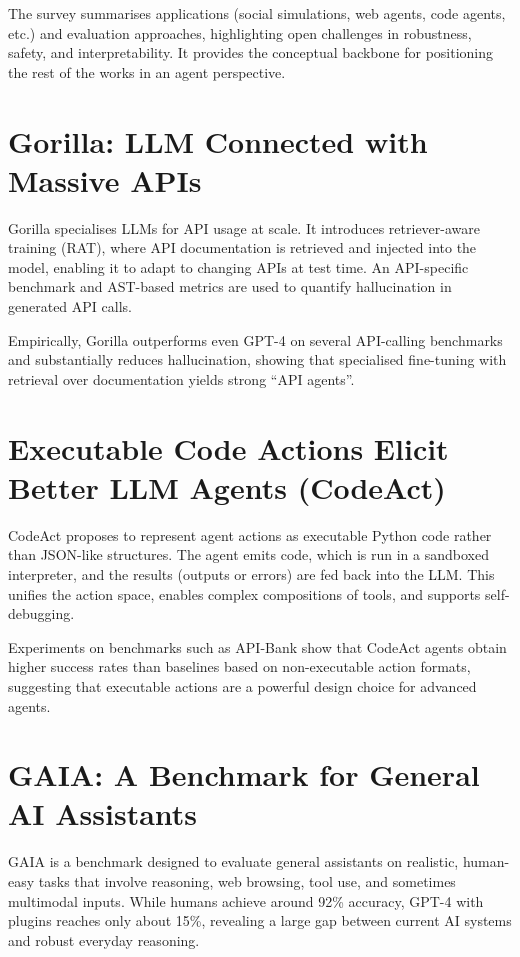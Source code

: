 \documentclass[11pt,a4paper]{article}
\begin{document}
The survey summarises applications (social simulations, web agents, code agents, etc.) and evaluation approaches, highlighting open challenges in robustness, safety, and interpretability. It provides the conceptual backbone for positioning the rest of the works in an agent perspective.

\section{Gorilla: LLM Connected with Massive APIs}

Gorilla specialises LLMs for API usage at scale. It introduces retriever-aware training (RAT), where API documentation is retrieved and injected into the model, enabling it to adapt to changing APIs at test time. An API-specific benchmark and AST-based metrics are used to quantify hallucination in generated API calls.

Empirically, Gorilla outperforms even GPT-4 on several API-calling benchmarks and substantially reduces hallucination, showing that specialised fine-tuning with retrieval over documentation yields strong \enquote{API agents}.

\section{Executable Code Actions Elicit Better LLM Agents (CodeAct)}

CodeAct proposes to represent agent actions as executable Python code rather than JSON-like structures. The agent emits code, which is run in a sandboxed interpreter, and the results (outputs or errors) are fed back into the LLM. This unifies the action space, enables complex compositions of tools, and supports self-debugging.

Experiments on benchmarks such as API-Bank show that CodeAct agents obtain higher success rates than baselines based on non-executable action formats, suggesting that executable actions are a powerful design choice for advanced agents.

\section{GAIA: A Benchmark for General AI Assistants}

GAIA is a benchmark designed to evaluate general assistants on realistic, human-easy tasks that involve reasoning, web browsing, tool use, and sometimes multimodal inputs. While humans achieve around 92\% accuracy, GPT-4 with plugins reaches only about 15\%, revealing a large gap between current AI systems and robust everyday reasoning.
\end{document}
